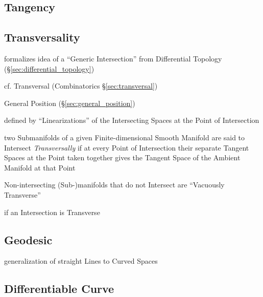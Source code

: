 \subsection{Tangency}\label{sec:tangency}

\subsection{Transversality}\label{sec:transversality}

formalizes idea of a ``Generic Intersection'' from Differential Topology
(\S\ref{sec:differential_topology})

cf. Transversal (Combinatorics \S\ref{sec:transversal})

General Position (\S\ref{sec:general_position})

defined by ``Linearizations'' of the Intersecting Spaces at the Point of
Intersection

two Submanifolds of a given Finite-dimensional Smooth Manifold are said to
Intersect \emph{Transversally} if at every Point of Intersection their separate
Tangent Spaces at the Point taken together gives the Tangent Space of the
Ambient Manifold at that Point

Non-intersecting (Sub-)manifolds that do not Intersect are ``Vacuously
Transverse''

if an Intersection is Transverse



\subsection{Geodesic}\label{sec:geodesic}

generalization of straight Lines to Curved Spaces



\subsection{Differentiable Curve}\label{sec:differentiable_curve}

